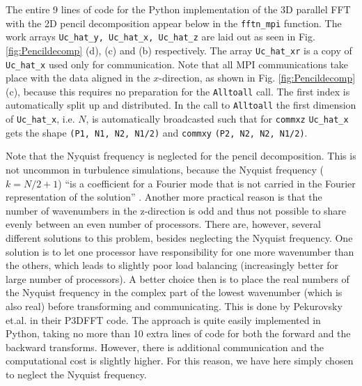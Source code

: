 \documentclass[11pt, oneside]{article}
\newcommand{\inpyth}{\lstinline[style=pythonstyle, basicstyle=\ttfamily]} %[]%
\begin{document}
The entire 9 lines of code for the Python implementation of the 3D parallel FFT with the 2D pencil decomposition appear below in the \inpyth{fftn_mpi} function. The work arrays \inpyth{Uc_hat_y, Uc_hat_x, Uc_hat_z} are laid out as seen in Fig. \ref{fig:Pencildecomp} (d), (c) and (b) respectively. The array \inpyth{Uc_hat_xr} is a copy of \inpyth{Uc_hat_x} used only for communication. Note that all MPI communications take place with the data aligned in the $x$-direction, as shown in Fig. \ref{fig:Pencildecomp} (c), because this requires no preparation for the \inpyth{Alltoall} call. The first index is automatically split up and distributed.  In the call to \inpyth{Alltoall} the first dimension of \inpyth{Uc_hat_x}, i.e. $N$, is automatically broadcasted such that for \inpyth{commxz} \inpyth{Uc_hat_x} gets the shape \inpyth{(P1, N1, N2, N1/2)} and \inpyth{commxy} \inpyth{(P2, N2, N2, N1/2)}.

Note that the Nyquist frequency is neglected for the pencil decomposition. This is not uncommon in turbulence simulations, because the Nyquist frequency ($k=N/2+1$) ``is a coefficient for a Fourier mode that is not carried in the Fourier representation of the solution'' \cite{Lee2013}.  Another more practical reason is that the number of wavenumbers in the z-direction is odd and thus not possible to share evenly between an even number of processors. There are, however, several different solutions to this problem, besides neglecting the Nyquist frequency. One solution is to let one processor have responsibility for one more wavenumber than the others, which leads to slightly poor load balancing (increasingly better for large number of processors). A better choice then is to place the real numbers of the Nyquist frequency in the complex part of the lowest wavenumber (which is also real) before transforming and communicating. This is done by Pekurovsky et.al. \cite{pekurovsky2012} in their P3DFFT code. The approach is quite easily implemented in Python, taking no more than 10 extra lines of code for both the forward and the backward transforms. However, there is additional communication and the computational cost is slightly higher. For this reason, we have here simply chosen to neglect the Nyquist frequency.
\end{document}
